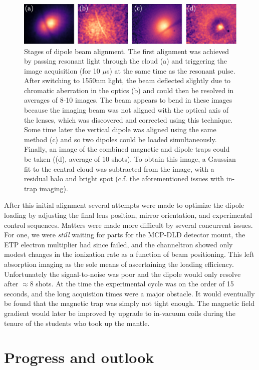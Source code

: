 	\begin{figure}
	\centering
	\includegraphics[width=\textwidth]{fig/lattice/dipole_alignment_stages}
		\caption{Stages of dipole beam alignment.
	The first alignment was achieved by passing resonant light through the cloud (a) and triggering the image acquisition (for 10 $\mu$s) at the same time as the resonant pulse.
	After switching to 1550nm light, the beam deflected slightly due to chromatic aberration in the optics (b) and could then be resolved in averages of 8-10 images. 
	The beam appears to bend in these images because the imaging beam was not aligned with the optical axis of the lenses, which was discovered and corrected using this technique.
	Some time later the vertical dipole was aligned using the same method (c) and so two dipoles could be loaded simultaneously. 
	Finally, an image of the combined magnetic and dipole traps could be taken ((d), average of 10 shots). To obtain this image, a Gaussian fit to the central cloud was subtracted from the image, with a residual halo and bright spot (c.f. the aforementioned issues with in-trap imaging).}
	\label{fig:dipole_align}
	\end{figure}

	After this initial alignment several attempts were made to optimize the dipole loading by adjusting the final lens position, mirror orientation, and experimental control sequences.	
	Matters were made more difficult by several concurrent issues.
	For one, we were \emph{still} waiting for parts for the MCP-DLD detector mount, the ETP electron multiplier had since failed, and the channeltron showed only modest changes in the ionization rate as a function of beam positioning.	
	This left absorption imaging as the sole means of ascertaining the loading efficiency.
	Unfortunately the signal-to-noise was poor and the dipole would only resolve after $\approx 8$ shots.
	At the time the experimental cycle was on the order of 15 seconds, and the long acquistion times were a major obstacle.
	It would eventually be found that the magnetic trap was simply not tight enough.
	The magnetic field gradient would later be improved by upgrade to in-vacuum coils during the tenure of the students who took up the mantle.
	

\section{Progress and outlook}
	


